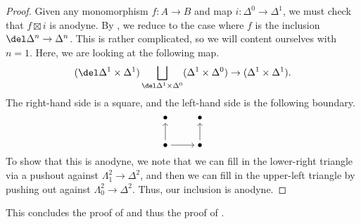 \documentclass[../notes.tex]{subfiles}
\begin{document}
\begin{proof}
	Given any monomorphism $f\colon A\to B$ and map $i\colon\Delta^0\to\Delta^1$, we must check that $f\boxtimes i$ is anodyne. By , we reduce to the case where $f$ is the inclusion $\del\Delta^n\to\Delta^n$. This is rather complicated, so we will content ourselves with $n=1$. Here, we are looking at the following map.
	\[(\del\Delta^1\times\Delta^1)\bigsqcup_{\del\Delta^1\times\Delta^0}(\Delta^1\times\Delta^0)\to(\Delta^1\times\Delta^1).\]
	The right-hand side is a square, and the left-hand side is the following boundary.
	\[\begin{tikzcd}[cramped]
		\bullet & \bullet \\
		\bullet & \bullet
		\arrow[from=2-1, to=1-1]
		\arrow[from=2-1, to=2-2]
		\arrow[from=2-2, to=1-2]
	\end{tikzcd}\]
	To show that this is anodyne, we note that we can fill in the lower-right triangle via a pushout against $\Lambda_1^2\to\Delta^2$, and then we can fill in the upper-left triangle by pushing out against $\Lambda_0^2\to\Delta^2$. Thus, our inclusion is anodyne.
\end{proof}
This concludes the proof of  and thus the proof of .
\end{document}
